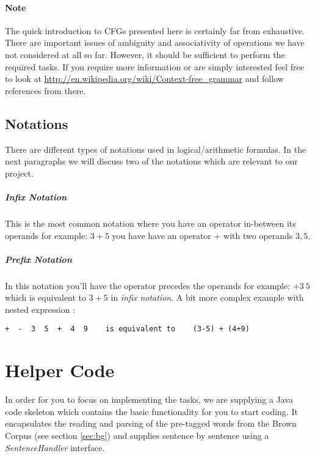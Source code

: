 \documentclass[11pt]{article}
\begin{document}
\paragraph{Note} The quick introduction to CFGs presented here is certainly far from exhaustive. There are important issues of ambiguity and associativity of operations we have not considered at all so far. However, it should be sufficient to perform the required tasks. If you require more information or are simply interested feel free to look at \url{http://en.wikipedia.org/wiki/Context-free_grammar} and follow references from there.

\subsection{Notations}
\label{ssec:notations}
There are different types of notations used in logical/arithmetic  formulas.  In the next paragraphs we will discuss two of the notations which are relevant to our project.

\subparagraph{Infix Notation}
This is the most common notation where you have an operator in-between its operands for example: $3 + 5$ you have have an operator $+$ with two operands $3, 5$. 

\subparagraph{Prefix Notation}
In this notation you'll have the operator precedes the operands for example: $+ 3 \ 5$ which is equivalent to $3 + 5$ in \textit{infix notation}. A bit more complex example with nested expression :
\begin{verbatim}
+  -  3  5  +  4  9    is equivalent to    (3-5) + (4+9)
\end{verbatim}


\section{Helper Code}
In order for you to focus on implementing the tasks, we are supplying a Java code skeleton which contains the basic functionality for you to start coding. It encapsulates the reading and parsing of the pre-tagged words from the Brown Corpus (see section \ref{sec:bg}) and supplies sentence by sentence using a \textit{SentenceHandler} interface.\\
\end{document}

